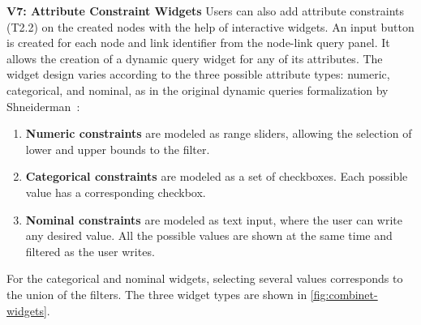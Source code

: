 \noindent\textbf{V7: Attribute Constraint Widgets}\label{sec:attributes}
Users can also add attribute constraints (T2.2) on the created nodes with the help of interactive widgets.
An input button is created for each node and link identifier from the node-link query panel.
It allows the creation of a dynamic query widget for any of its attributes.
The widget design varies according to the three possible attribute types: numeric, categorical, and nominal, as in the original dynamic queries formalization by Shneiderman~\cite{DynamicQueries}:
\begin{enumerate}
    \item \textbf{Numeric constraints} are modeled as range sliders, allowing the selection of lower and upper bounds to the filter.
    \item \textbf{Categorical constraints} are modeled as a set of checkboxes. Each possible value has a corresponding checkbox.
    \item \textbf{Nominal constraints} are modeled as text input, where the user can write any desired value. All the possible values are shown at the same time and filtered as the user writes.
\end{enumerate}

For the categorical and nominal widgets, selecting several values corresponds to the union of the filters.
The three widget types are shown in \autoref{fig:combinet-widgets}.

